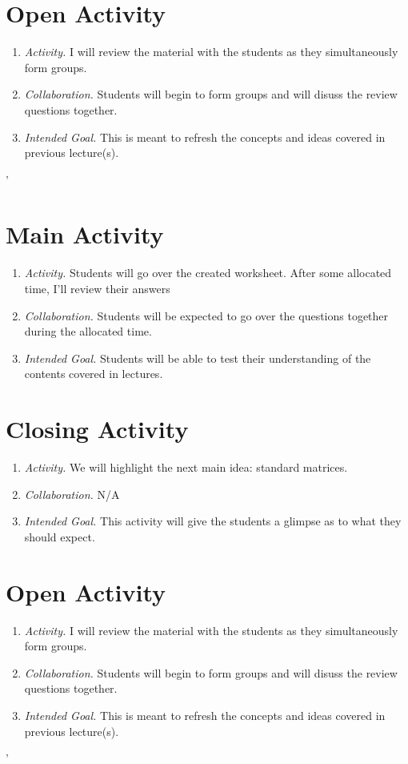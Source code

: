 \documentclass[11pt]{article}
\begin{document}
\section{\centering Open Activity}
	\begin{enumerate}
		\item \textit{Activity.} I will review the material with the students as they simultaneously form groups.
		\item \textit{Collaboration.} Students will begin to form groups and will disuss the review questions together.
		\item \textit{Intended Goal.} This is meant to refresh the concepts and ideas covered in previous lecture(s).
	\end{enumerate}'

\section{\centering Main Activity}
	\begin{enumerate}
		\item \textit{Activity.} Students will go over the created worksheet. After some allocated time, I'll review their answers
		\item \textit{Collaboration.} Students will be expected to go over the questions together during the allocated time.
		\item \textit{Intended Goal.} Students will be able to test their understanding of the contents covered in lectures.
	\end{enumerate}
\section{\centering Closing Activity}
	\begin{enumerate}
		\item \textit{Activity.} We will highlight the next main idea: standard matrices.
		\item \textit{Collaboration.} N/A
		\item \textit{Intended Goal.} This activity will give the students a glimpse as to what they should expect.
	\end{enumerate}

\newpage
{}
\section{\centering Open Activity}
	\begin{enumerate}
		\item \textit{Activity.} I will review the material with the students as they simultaneously form groups.
		\item \textit{Collaboration.} Students will begin to form groups and will disuss the review questions together.
		\item \textit{Intended Goal.} This is meant to refresh the concepts and ideas covered in previous lecture(s).
	\end{enumerate}'
\end{document}
